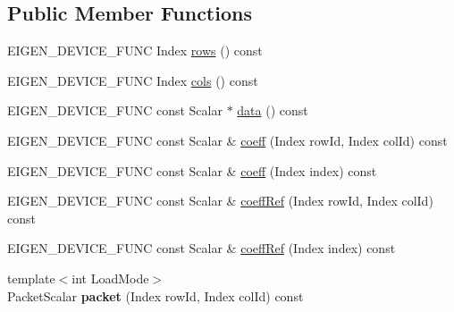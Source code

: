 \subsection*{Public Member Functions}
\begin{DoxyCompactItemize}
\item 
E\+I\+G\+E\+N\+\_\+\+D\+E\+V\+I\+C\+E\+\_\+\+F\+U\+NC Index \mbox{\hyperlink{class_eigen_1_1_map_base_3_01_derived_00_01_read_only_accessors_01_4_a78b3ab4983de51f112e6a062ac8f6ffd}{rows}} () const
\item 
E\+I\+G\+E\+N\+\_\+\+D\+E\+V\+I\+C\+E\+\_\+\+F\+U\+NC Index \mbox{\hyperlink{class_eigen_1_1_map_base_3_01_derived_00_01_read_only_accessors_01_4_ad345a6b995b9894e9b076ee174876659}{cols}} () const
\item 
E\+I\+G\+E\+N\+\_\+\+D\+E\+V\+I\+C\+E\+\_\+\+F\+U\+NC const Scalar $\ast$ \mbox{\hyperlink{class_eigen_1_1_map_base_3_01_derived_00_01_read_only_accessors_01_4_ad8c55bd47422cebca456f802c29c451e}{data}} () const
\item 
E\+I\+G\+E\+N\+\_\+\+D\+E\+V\+I\+C\+E\+\_\+\+F\+U\+NC const Scalar \& \mbox{\hyperlink{class_eigen_1_1_map_base_3_01_derived_00_01_read_only_accessors_01_4_ac303d927b8d2e3ac1e2fd76053c8119f}{coeff}} (Index row\+Id, Index col\+Id) const
\item 
E\+I\+G\+E\+N\+\_\+\+D\+E\+V\+I\+C\+E\+\_\+\+F\+U\+NC const Scalar \& \mbox{\hyperlink{class_eigen_1_1_map_base_3_01_derived_00_01_read_only_accessors_01_4_a3786c4aedbd29f75750bd434654b21f7}{coeff}} (Index index) const
\item 
E\+I\+G\+E\+N\+\_\+\+D\+E\+V\+I\+C\+E\+\_\+\+F\+U\+NC const Scalar \& \mbox{\hyperlink{class_eigen_1_1_map_base_3_01_derived_00_01_read_only_accessors_01_4_ad4e9a2bf0255f870a45ce88e30815b59}{coeff\+Ref}} (Index row\+Id, Index col\+Id) const
\item 
E\+I\+G\+E\+N\+\_\+\+D\+E\+V\+I\+C\+E\+\_\+\+F\+U\+NC const Scalar \& \mbox{\hyperlink{class_eigen_1_1_map_base_3_01_derived_00_01_read_only_accessors_01_4_abae7b3615ed05ef13cd06065fe71c98e}{coeff\+Ref}} (Index index) const
\item 
\mbox{\label{class_eigen_1_1_map_base_3_01_derived_00_01_read_only_accessors_01_4_a1ea9c10e8c9997511c517e0417d99331}} 
{\footnotesize template$<$int Load\+Mode$>$ }\\Packet\+Scalar {\bfseries packet} (Index row\+Id, Index col\+Id) const
\item 

\end{DoxyCompactItemize}

